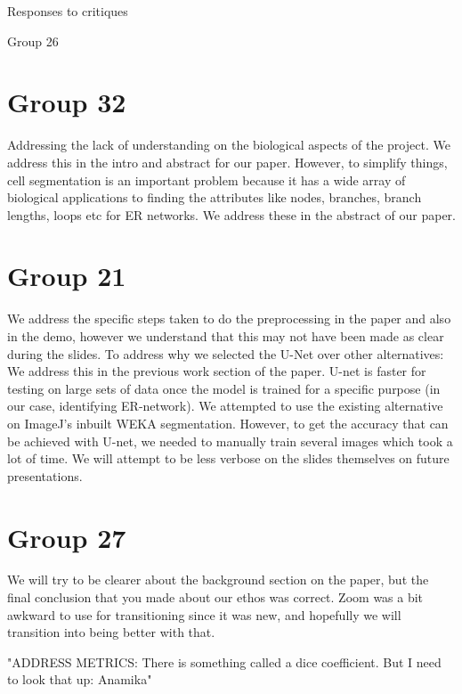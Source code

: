 \documentclass{article}
\begin{document}
\centerline{Responses to critiques}

\centerline{Group 26}
\vspace{2pc}

\section{Group 32}
Addressing the lack of understanding on the biological aspects of the project. We address this in the intro and abstract for our paper. However, to simplify things, cell segmentation is an important problem because it has a wide array of biological applications to finding the attributes like nodes, branches, branch lengths, loops etc for ER networks. We address these in the abstract of our paper. 

\section{Group 21}
We address the specific steps taken to do the preprocessing in the paper and also in the demo, however we understand that this may not have been made as clear during the slides. 
To address why we selected the U-Net over other alternatives:
We address this in the previous work section of the paper. U-net is faster for testing on large sets of data once the model is trained for a specific purpose (in our case, identifying ER-network). We attempted to use the existing alternative on ImageJ's inbuilt WEKA segmentation. However, to get the accuracy that can be achieved with U-net, we needed to manually train several images which took a lot of time. 
We will attempt to be less verbose on the slides themselves on future presentations.

\section{Group 27}

We will try to be clearer about the background section on the paper, but the final conclusion that you made about our ethos was correct. Zoom was a bit awkward to use for transitioning since it was new, and hopefully we will transition into being better with that. 


"ADDRESS METRICS: There is something called a dice coefficient. But I need to look that up: Anamika"
\end{document}

